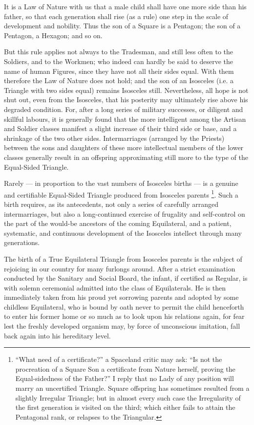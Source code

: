 \documentclass[12pt, a4paper, twoside]{memoir}
\begin{document}
It is a Law of Nature with us that a male child shall have one more side than
his father, so that each generation shall rise (as a rule) one step in the
scale of development and nobility. Thus the son of a Square is a Pentagon; the
son of a Pentagon, a Hexagon; and so on.

But this rule applies not always to the Tradesman, and still less often to the
Soldiers, and to the Workmen; who indeed can hardly be said to deserve the
name of human Figures, since they have not all their sides equal. With them
therefore the Law of Nature does not hold; and the son of an Isosceles (i.e. a
Triangle with two sides equal) remains Isosceles still. Nevertheless, all hope
is not shut out, even from the Isosceles, that his posterity may ultimately
rise above his degraded condition. For, after a long series of military
successes, or diligent and skillful labours, it is generally found that the
more intelligent among the Artisan and Soldier classes manifest a slight
increase of their third side or base, and a shrinkage of the two other sides.
Intermarriages (arranged by the Priests) between the sons and daughters of
these more intellectual members of the lower classes generally result in an
offspring approximating still more to the type of the Equal-Sided Triangle.

Rarely --- in proportion to the vast numbers of Isosceles births --- is a genuine
and certifiable Equal-Sided Triangle produced from Isosceles parents
\footnote{ ``What need of a certificate?'' a Spaceland critic may ask: ``Is not
the procreation of a Square Son a certificate from Nature herself, proving the
Equal-sidedness of the Father?'' I reply that no Lady of any position will
marry an uncertified Triangle. Square offspring has sometimes resulted from a
slightly Irregular Triangle; but in almost every such case the Irregularity of
the first generation is visited on the third; which either fails to attain the
Pentagonal rank, or relapses to the Triangular.}. Such a birth requires, as
its antecedents, not only a series of carefully arranged intermarriages, but
also a long-continued exercise of frugality and self-control on the part of
the would-be ancestors of the coming Equilateral, and a patient, systematic,
and continuous development of the Isosceles intellect through many
generations.

The birth of a True Equilateral Triangle from Isosceles parents is the subject
of rejoicing in our country for many furlongs around. After a strict
examination conducted by the Sanitary and Social Board, the infant, if
certified as Regular, is with solemn ceremonial admitted into the class of
Equilaterals. He is then immediately taken from his proud yet sorrowing
parents and adopted by some childless Equilateral, who is bound by oath never
to permit the child henceforth to enter his former home or so much as to look
upon his relations again, for fear lest the freshly developed organism may, by
force of unconscious imitation, fall back again into his hereditary level.
\end{document}
